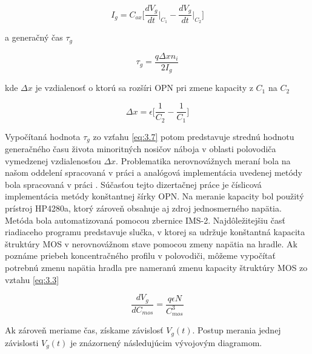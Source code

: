 \begin{equation}\label{eq:3.6}
I_g = C_{ox} \Big[\frac{dV_g}{dt}\Big\rvert_{C_1} - \frac{dV_g}{dt}\Big\rvert_{C_2}\Big]
\end{equation}

a generačný čas $\tau_g$

\begin{equation}\label{eq:3.7}
\tau_g = \frac{q\Delta x n_i}{2I_g}
\end{equation}

kde $\Delta x$ je vzdialenosť o ktorú sa rozšíri OPN pri zmene
kapacity z $C_1$ na $C_2$

\begin{equation}\label{eq:3.8}
\Delta x = \epsilon \Big[\frac{1}{C_2} - \frac{1}{C_1}\Big]
\end{equation}

Vypočítaná hodnota $\tau_g$ zo vzťahu \ref{eq:3.7} potom predstavuje
strednú hodnotu generačného času života minoritných nosičov náboja v
oblasti polovodiča vymedzenej vzdialenosťou $\Delta x$.  Problematika
nerovnovážnych meraní bola na našom oddelení spracovaná v práci
\cite{1.6} a analógová implementácia uvedenej metódy bola spracovaná v
práci \cite{3.13}. Súčasťou tejto dizertačnej práce je číslicová
implementácia metódy konštantnej šírky OPN. Na meranie kapacity bol
použitý prístroj HP4280a, ktorý zároveň obsahuje aj zdroj
jednosmerného napätia. Metóda bola automatizovaná pomocou zbernice
IMS-2.  Najdôležitejšiu časť riadiaceho programu predstavuje slučka, v
ktorej sa udržuje konštantná kapacita štruktúry MOS v nerovnovážnom
stave pomocou zmeny napätia na hradle.  Ak poznáme priebeh
koncentračného profilu v polovodiči, môžeme vypočítať potrebnú zmenu
napätia hradla pre nameranú zmenu kapacity štruktúry MOS zo vztahu
\ref{eq:3.3}

\begin{equation}\label{eq:3.9}
\frac{dV_g}{dC_{mos}} = \frac{q\epsilon N}{C^3_{mos}}
\end{equation}

Ak zároveň meriame čas, získame závislosť $V_g(t)$. Postup merania
jednej závislosti $V_g(t)$ je znázornený následujúcim vývojovým
diagramom.

